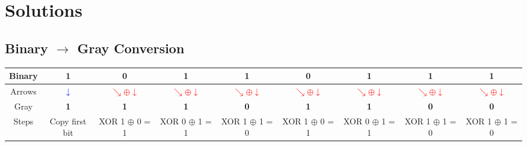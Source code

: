 



\section*{Solutions}

\subsection*{Binary $\to$ Gray Conversion}


\begin{center}
\renewcommand{\arraystretch}{1.3}
\begin{tabular}{|c|*8{c|}}
  \hline
    Binary &
    1 &    0 &    1 &    1 &    0 &    1 &    1 &    1  \\
  \hline

  Arrows &
      \textcolor{blue}{$\downarrow$} &
        \textcolor{red}{$\searrow \oplus \downarrow$} &        \textcolor{red}{$\searrow \oplus \downarrow$} &        \textcolor{red}{$\searrow \oplus \downarrow$} &        \textcolor{red}{$\searrow \oplus \downarrow$} &        \textcolor{red}{$\searrow \oplus \downarrow$} &        \textcolor{red}{$\searrow \oplus \downarrow$} &        \textcolor{red}{$\searrow \oplus \downarrow$}  \\
  \hline

    Gray &
    \textbf{ 1 } &    \textbf{ 1 } &    \textbf{ 1 } &    \textbf{ 0 } &    \textbf{ 1 } &    \textbf{ 1 } &    \textbf{ 0 } &    \textbf{ 0 }  \\
  \hline

  Steps &
    {\scriptsize Copy first bit } &    {\scriptsize XOR 1 $\oplus$ 0 = 1 } &    {\scriptsize XOR 0 $\oplus$ 1 = 1 } &    {\scriptsize XOR 1 $\oplus$ 1 = 0 } &    {\scriptsize XOR 1 $\oplus$ 0 = 1 } &    {\scriptsize XOR 0 $\oplus$ 1 = 1 } &    {\scriptsize XOR 1 $\oplus$ 1 = 0 } &    {\scriptsize XOR 1 $\oplus$ 1 = 0 }  \\
  \hline
\end{tabular}
\end{center}

\bigskip

